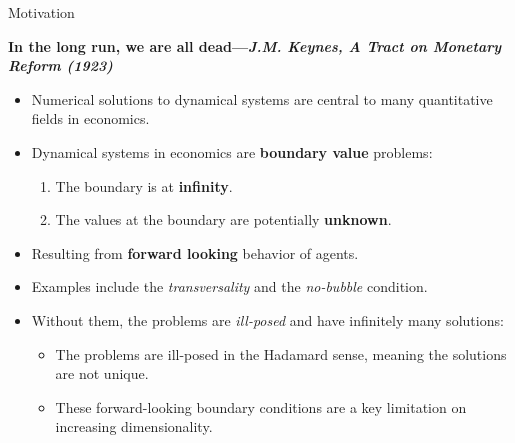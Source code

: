 \documentclass[aspectratio=169,10pt]{beamer}
\newcommand{\emphcolor}[1]{\textbf{\textcolor{emphcolorval}{#1}}}
\begin{document}
\begin{frame}{Motivation}
	\begin{center}
		\emphcolor{In the long run, we are all dead---{\it J.M. Keynes, A Tract on Monetary Reform (1923)}}
	\end{center}
	\begin{itemize}
		\item Numerical solutions to dynamical systems are central to many quantitative fields in economics.
		\vspace{0.1in}
		\item Dynamical systems in economics are \emphcolor{boundary value} problems:
		\vspace{0.1in}
		\begin{enumerate}
				\item The boundary is at \emphcolor{infinity}.
				\vspace{0.05in}
				\item The values at the boundary are potentially \emphcolor{unknown}.
				\vspace{0.05in}  
		\end{enumerate}
		\item Resulting from \emphcolor{forward looking} behavior of agents.
		\vspace{0.1in}
		\item Examples include the \emph{{\it transversality}} and the \emph{\it  no-bubble} condition.
		\vspace{0.1in}
		\item Without them, the problems are \emph{ill-posed} and have infinitely many solutions: 
		\vspace{0.1in}
		\begin{itemize}
			\item The problems are ill-posed in the Hadamard sense, meaning the solutions are not unique.
			\item These forward-looking boundary conditions are a key limitation on increasing dimensionality.
		\end{itemize}
	\end{itemize}
\end{frame}
\end{document}
